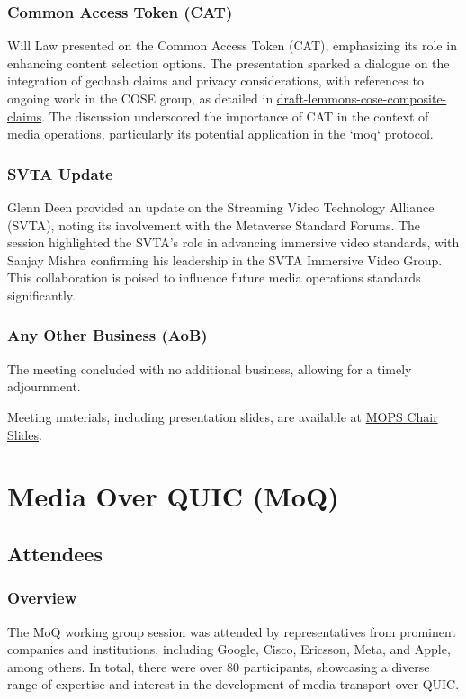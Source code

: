 \documentclass{article}
\begin{document}
\subsubsection{Common Access Token (CAT)}

Will Law presented on the Common Access Token (CAT), emphasizing its role in enhancing content selection options. The presentation sparked a dialogue on the integration of geohash claims and privacy considerations, with references to ongoing work in the COSE group, as detailed in \href{https://datatracker.ietf.org/doc/draft-lemmons-cose-composite-claims}{draft-lemmons-cose-composite-claims}. The discussion underscored the importance of CAT in the context of media operations, particularly its potential application in the `moq` protocol.

\subsubsection{SVTA Update}

Glenn Deen provided an update on the Streaming Video Technology Alliance (SVTA), noting its involvement with the Metaverse Standard Forums. The session highlighted the SVTA's role in advancing immersive video standards, with Sanjay Mishra confirming his leadership in the SVTA Immersive Video Group. This collaboration is poised to influence future media operations standards significantly.

\subsubsection{Any Other Business (AoB)}

The meeting concluded with no additional business, allowing for a timely adjournment.

Meeting materials, including presentation slides, are available at \href{https://datatracker.ietf.org/meeting/121/materials/slides-121-mops-mops-chair-slides-ietf-121-01}{MOPS Chair Slides}.




\newpage

\section{Media Over QUIC (MoQ)}

\subsection{Attendees}
\subsubsection{Overview}
The MoQ working group session was attended by representatives from prominent companies and institutions, including Google, Cisco, Ericsson, Meta, and Apple, among others. In total, there were over 80 participants, showcasing a diverse range of expertise and interest in the development of media transport over QUIC.
\end{document}
